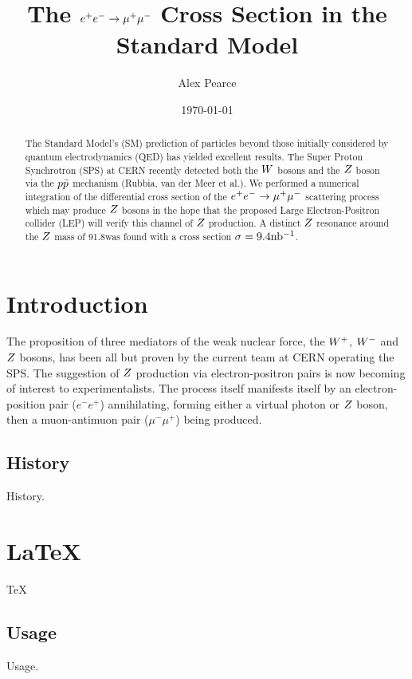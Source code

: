 \documentclass[]{article}
\begin{document}
\title{The $\ee \rarrow \mumu$ Cross Section in the Standard Model}
\author{Alex Pearce}
\date{\today}
\maketitle

\begin{abstract}
	The Standard Model's (SM) prediction of particles beyond those initially considered by quantum electrodynamics (QED) has yielded excellent results. The Super Proton Synchrotron (SPS) at CERN recently detected both the $W $ bosons and the $Z $ boson via the $p\bar{p}$ mechanism (Rubbia, van der Meer et al.). We performed a numerical integration of the differential cross section of the $\ee \rarrow \mumu$ scattering process which may produce $Z $ bosons in the hope that the proposed Large Electron-Positron collider (LEP) will verify this channel of $Z $ production. A distinct $Z $ resonance around the $Z $ mass of 91.8\GeV was found with a cross section $\sigma=9.4\mbox{nb$^{-1}$} $.
\end{abstract}


\section{Introduction}
The proposition of three mediators of the weak nuclear force, the $W^+ $, $W^- $ and $Z $ bosons, has been all but proven by the current team at CERN operating the SPS. The suggestion of $Z $ production via electron-positron pairs is now becoming of interest to experimentalists. The process itself manifests itself by an electron-position pair ($e^{-}e^{+}$) annihilating, forming either a virtual photon or $Z $ boson, then a muon-antimuon pair ($\mu^{-}\mu^{+}$) being produced.

\subsection{History}
History.

\section{\LaTeX}
\TeX

\subsection{Usage}
Usage.

\begin{thebibliography}{9}
\end{thebibliography}
\end{document}
